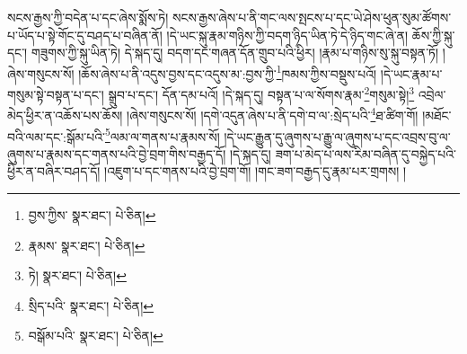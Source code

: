 སངས་རྒྱས་ཀྱི་བདེན་པ་དང་ཞེས་སྨོས་ཏེ། སངས་རྒྱས་ཞེས་པ་ནི་གང་ལས་སྤངས་པ་དང་ཡེ་ཤེས་ཕུན་སུམ་ཚོགས་པ་ཡོད་པ་སྟེ་གོང་དུ་བཤད་པ་བཞིན་ནོ། །དེ་ཡང་སྐུ་རྣམ་གཉིས་ཀྱི་བདག་ཉིད་ཡིན་ཏེ་དེ་ཉིད་གང་ཞེ་ན། ཆོས་ཀྱི་སྐུ་དང་། གཟུགས་ཀྱི་སྐུ་ཡིན་ཏེ། དེ་སྐད་དུ། བདག་དང་གཞན་དོན་གྲུབ་པའི་ཕྱིར། །རྣམ་པ་གཉིས་སུ་སྐུ་བསྟན་ཏོ། །ཞེས་གསུངས་སོ། །ཆོས་ཞེས་པ་ནི་འདུས་བྱས་དང་འདུས་མ་:བྱས་ཀྱི་\footnote{བྱས་ཀྱིས་  སྣར་ཐང་།  པེ་ཅིན། }ཁམས་ཀྱིས་བསྡུས་པའོ། །དེ་ཡང་རྣམ་པ་གསུམ་སྟེ་བསྟན་པ་དང་། སྒྲུབ་པ་དང་། དོན་དམ་པའོ། །དེ་སྐད་དུ། བསྟན་པ་ལ་སོགས་རྣམ་\footnote{རྣམས་  སྣར་ཐང་།  པེ་ཅིན། }གསུམ་སྟེ།\footnote{ཏེ།  སྣར་ཐང་།  པེ་ཅིན། } འབྲེལ་མེད་ཕྱིར་ན་འཆོས་པས་ཆོས། །ཞེས་གསུངས་སོ། །དགེ་འདུན་ཞེས་པ་ནི་དགེ་བ་ལ་:སྲེད་པའི་\footnote{སྲིད་པའི་  སྣར་ཐང་།  པེ་ཅིན། }ཐ་ཚིག་གོ། །མཐོང་བའི་ལམ་དང་:སྒོམ་པའི་\footnote{བསྒོམ་པའི་  སྣར་ཐང་།  པེ་ཅིན། }ལམ་ལ་གནས་པ་རྣམས་སོ། །དེ་ཡང་རྒྱུན་དུ་ཞུགས་པ་རྒྱུ་ལ་ཞུགས་པ་དང་འབྲས་བུ་ལ་ཞུགས་པ་རྣམས་དང་གནས་པའི་བྱེ་བྲག་གིས་བརྒྱད་དོ། །དེ་སྐད་དུ། ཟག་པ་མེད་པ་ལས་རིམ་བཞིན་དུ་བསྐྱེད་པའི་ཕྱིར་ན་བཞིར་བཤད་དོ། །འཇུག་པ་དང་གནས་པའི་བྱེ་བྲག་གོ། །གང་ཟག་བརྒྱད་དུ་རྣམ་པར་གྲགས། །
